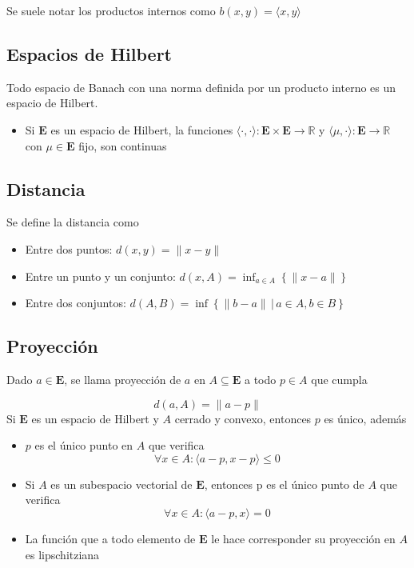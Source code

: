 Se suele notar los productos internos como $b(x,y)=\langle x,y\rangle$

\subsection{Espacios de Hilbert}

Todo espacio de Banach con una norma definida por un producto interno es un espacio de Hilbert.

\begin{itemize}
    \item Si $\mathbf{E}$ es un espacio de Hilbert, la funciones $\langle\cdot,\cdot\rangle:\mathbf{E}\times\mathbf{E}\to\mathbb{R}$ y $\langle\mu,\cdot\rangle:\mathbf{E}\to\mathbb{R}$ con $\mu\in\mathbf{E}$ fijo, son continuas
\end{itemize}

\subsection{Distancia}

Se define la distancia como

\begin{itemize}
    \item Entre dos puntos: $d(x,y)=\|x-y\|$
    \item Entre un punto y un conjunto: $d(x,A)=\inf_{a\in A}\left\{\|x-a\|\right\}$
    \item Entre dos conjuntos: $d(A,B)=\inf\left\{\|b-a\|\,|\,a\in A, b\in B\right\}$
\end{itemize}

\subsection{Proyección}

Dado $a\in\mathbf{E}$, se llama proyección de $a$ en $A\subseteq\mathbf{E}$ a todo $p\in A$ que cumpla

\[d(a,A) = \|a-p\|\]
\bigbreak
Si $\mathbf{E}$ es un espacio de Hilbert y $A$ cerrado y convexo, entonces $p$ es único, además

\begin{itemize}
    \item $p$ es el único punto en $A$ que verifica
    \[\forall x\in A: \langle a-p, x-p\rangle\leq 0\]
    \item Si $A$ es un subespacio vectorial de $\mathbf{E}$, entonces p es el único punto de $A$ que verifica
    \[\forall x\in A: \langle a-p, x\rangle = 0\]
    \item La función que a todo elemento de $\mathbf{E}$ le hace corresponder su proyección en $A$ es lipschitziana
\end{itemize}

